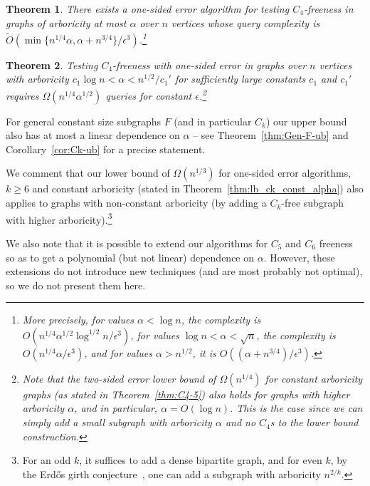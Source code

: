 \documentclass{article}
\newcommand{\eps}{\epsilon}
\newtheorem{theorem}{Theorem}
\newcommand{\SodaReb}[1]{{ #1}}
\newcommand{\ICALPCR}[1]{{#1}}
\begin{document}
\ICALPCR{
\begin{theorem}\label{thm:C4-ub}
There exists a one-sided error algorithm for testing $C_4$-freeness in graphs of arboricity at most $\alpha$ over $n$ vertices whose query complexity  is $\tilde{O}\left(\min\{n^{1/4}\alpha, \alpha+n^{3/4}\}/\eps^3\right)$.\footnote{More precisely, for values $\alpha<\log n$, the complexity is $O(n^{1/4}\alpha^{1/2}\log^{1/2}n/\eps^3)$, for values $\log n < \alpha<\sqrt n$, the complexity is $O(n^{1/4}\alpha/\eps^3)$, and for values $\alpha>n^{1/2}$, it is $O( (\alpha+n^{3/4})/\eps^3)$.}
\end{theorem}


\begin{theorem}\label{thm:C4-gen-alpha-lb}
Testing $C_4$-freeness with one-sided error in graphs over $n$ vertices with arboricity $c_1\log n < \alpha < n^{1/2}/c_1'$ for sufficiently large constants $c_1$ and $c_1'$ requires $\Omega(n^{1/4}\alpha^{1/2})$ queries for constant $\epsilon$.\footnote{Note that the two-sided error lower bound of $\Omega(n^{1/4})$ for constant arboricity graphs (as stated in Theorem~\ref{thm:C4-5}) also holds for graphs with higher arboricity $\alpha$, and in particular, $\alpha = O(\log n)$. This is the case since we can simply add a small subgraph with arboricity $\alpha$ and no $C_4$s to the lower bound construction.} 

\end{theorem}
}

For general
\SodaReb{constant size subgraphs $F$ (and in particular $C_k$)}
our upper bound also has at most a linear dependence on $\alpha$
--
see Theorem~\ref{thm:Gen-F-ub} and Corollary~\ref{cor:Ck-ub} for a precise statement.




We comment that our lower bound of $\Omega(n^{1/3})$  for one-sided error algorithms, $k \geq 6$ and constant arboricity (stated in Theorem~\ref{thm:lb_ck_const_alpha}) also applies to graphs with non-constant arboricity (by adding a $C_k$-free subgraph with  higher arboricity).\footnote{For an odd $k$, it suffices to add a dense bipartite graph, and for even $k$, by the Erd\H{o}s girth conjecture~\cite{E63}, one can add a subgraph with arboricity $n^{2/k}$.} 
 
We also note that it is possible to extend our algorithms for $C_5$ and $C_6$ freeness so as to get a polynomial (but not linear) dependence on $\alpha$. However,  these extensions do not introduce new techniques (and are most probably not optimal), so we do not present them here.
\end{document}
